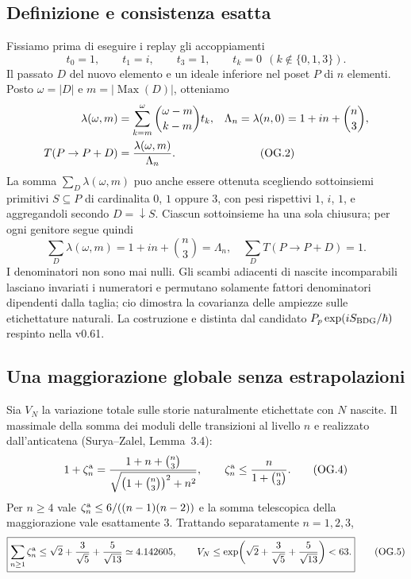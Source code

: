 \documentclass[11pt,a4paper]{article}
\begin{document}
\subsection*{Definizione e consistenza esatta}
Fissiamo prima di eseguire i replay gli accoppiamenti
\begin{equation}
\boxed{t_0=1,\qquad t_1=i,\qquad t_3=1,\qquad t_k=0\ \ (k\notin\{0,1,3\}).}\tag{OG.1}
\end{equation}
Il passato $D$ del nuovo elemento e un ideale inferiore nel poset $P$ di $n$ elementi. Posto $\omega=|D|$ e $m=|\operatorname{Max}(D)|$, otteniamo
\begin{align}
\lambda(\omega,m)&=\sum_{k=m}^{\omega}\binom{\omega-m}{k-m}t_k, &\Lambda_n&=\lambda(n,0)=1+in+\binom n3,\notag\\
T(P\to P+D)&=\frac{\lambda(\omega,m)}{\Lambda_n}.&&\tag{OG.2}
\end{align}
La somma $\sum_D\lambda(\omega,m)$ puo anche essere ottenuta scegliendo sottoinsiemi primitivi $S\subseteq P$ di cardinalita $0$, $1$ oppure $3$, con pesi rispettivi $1$, $i$, $1$, e aggregandoli secondo $D=\downarrow S$. Ciascun sottoinsieme ha una sola chiusura; per ogni genitore segue quindi
\begin{equation}
\boxed{\sum_D\lambda(\omega,m)=1+in+\binom n3=\Lambda_n,\quad\sum_DT(P\to P+D)=1.}\tag{OG.3}
\end{equation}
I denominatori non sono mai nulli. Gli scambi adiacenti di nascite incomparabili lasciano invariati i numeratori e permutano solamente fattori denominatori dipendenti dalla taglia; cio dimostra la covarianza delle ampiezze sulle etichettature naturali. La costruzione e distinta dal candidato $P_p\exp(iS_{\rm BDG}/\hbar)$ respinto nella v0.61.

\subsection*{Una maggiorazione globale senza estrapolazioni}
Sia $V_N$ la variazione totale sulle storie naturalmente etichettate con $N$ nascite. Il massimale della somma dei moduli delle transizioni al livello $n$ e realizzato dall'anticatena (Surya--Zalel, Lemma~3.4):
\begin{equation}
1+\zeta_n^{\rm a}=\frac{1+n+\binom n3}{\sqrt{\bigl(1+\binom n3\bigr)^2+n^2}},\qquad
\zeta_n^{\rm a}\le\frac{n}{1+\binom n3}.\tag{OG.4}
\end{equation}
Per $n\ge4$ vale $\zeta_n^{\rm a}\le6/((n-1)(n-2))$ e la somma telescopica della maggiorazione vale esattamente $3$. Trattando separatamente $n=1,2,3$,
\begin{equation}
\boxed{\sum_{n\ge1}\zeta_n^{\rm a}\le \sqrt2+\frac3{\sqrt5}+\frac5{\sqrt{13}}\simeq4.142605,\qquad
V_N\le\exp\!\left(\sqrt2+\frac3{\sqrt5}+\frac5{\sqrt{13}}\right)<63.}\tag{OG.5}
\end{equation}
\clearpage
\end{document}
